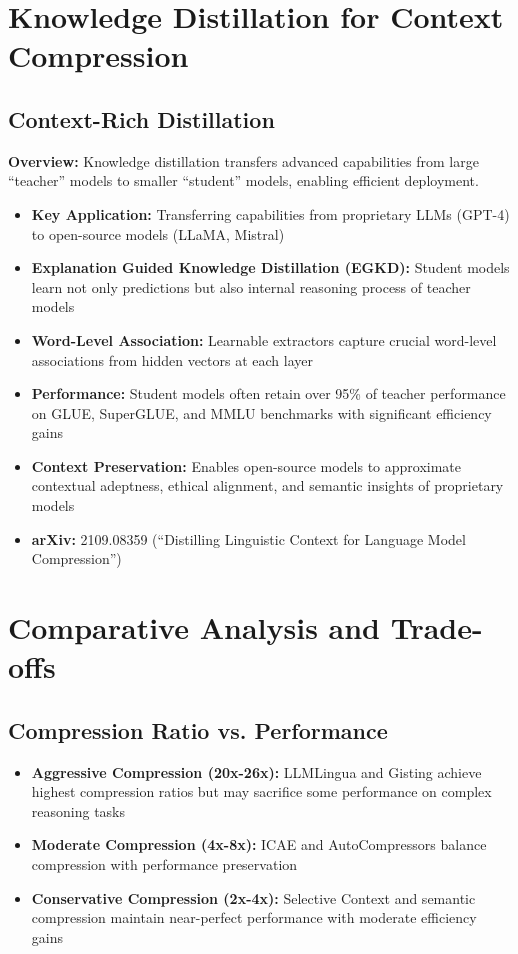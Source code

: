 \documentclass[11pt]{article}
\begin{document}
\section{Knowledge Distillation for Context Compression}

\subsection{Context-Rich Distillation}

\textbf{Overview:} Knowledge distillation transfers advanced capabilities from large ``teacher'' models to smaller ``student'' models, enabling efficient deployment.

\begin{itemize}[leftmargin=*]
    \item \textbf{Key Application:} Transferring capabilities from proprietary LLMs (GPT-4) to open-source models (LLaMA, Mistral)
    \item \textbf{Explanation Guided Knowledge Distillation (EGKD):} Student models learn not only predictions but also internal reasoning process of teacher models
    \item \textbf{Word-Level Association:} Learnable extractors capture crucial word-level associations from hidden vectors at each layer
    \item \textbf{Performance:} Student models often retain over 95\% of teacher performance on GLUE, SuperGLUE, and MMLU benchmarks with significant efficiency gains
    \item \textbf{Context Preservation:} Enables open-source models to approximate contextual adeptness, ethical alignment, and semantic insights of proprietary models
    \item \textbf{arXiv:} 2109.08359 (``Distilling Linguistic Context for Language Model Compression'')
\end{itemize}

\section{Comparative Analysis and Trade-offs}

\subsection{Compression Ratio vs. Performance}

\begin{itemize}[leftmargin=*]
    \item \textbf{Aggressive Compression (20x-26x):} LLMLingua and Gisting achieve highest compression ratios but may sacrifice some performance on complex reasoning tasks
    \item \textbf{Moderate Compression (4x-8x):} ICAE and AutoCompressors balance compression with performance preservation
    \item \textbf{Conservative Compression (2x-4x):} Selective Context and semantic compression maintain near-perfect performance with moderate efficiency gains
\end{itemize}
\end{document}
